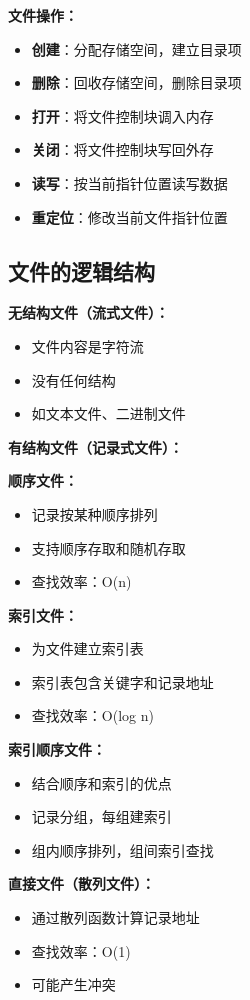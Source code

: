 \documentclass[lang=cn,newtx,10pt,scheme=chinese]{../../elegantbook}
\begin{document}
\textbf{文件操作：}
\begin{itemize}
  \item \textbf{创建}：分配存储空间，建立目录项
  \item \textbf{删除}：回收存储空间，删除目录项
  \item \textbf{打开}：将文件控制块调入内存
  \item \textbf{关闭}：将文件控制块写回外存
  \item \textbf{读写}：按当前指针位置读写数据
  \item \textbf{重定位}：修改当前文件指针位置
\end{itemize}

\subsection{文件的逻辑结构}

\textbf{无结构文件（流式文件）：}
\begin{itemize}
  \item 文件内容是字符流
  \item 没有任何结构
  \item 如文本文件、二进制文件
\end{itemize}

\textbf{有结构文件（记录式文件）：}

\textbf{顺序文件：}
\begin{itemize}
  \item 记录按某种顺序排列
  \item 支持顺序存取和随机存取
  \item 查找效率：O(n)
\end{itemize}

\textbf{索引文件：}
\begin{itemize}
  \item 为文件建立索引表
  \item 索引表包含关键字和记录地址
  \item 查找效率：O(log n)
\end{itemize}

\textbf{索引顺序文件：}
\begin{itemize}
  \item 结合顺序和索引的优点
  \item 记录分组，每组建索引
  \item 组内顺序排列，组间索引查找
\end{itemize}

\textbf{直接文件（散列文件）：}
\begin{itemize}
  \item 通过散列函数计算记录地址
  \item 查找效率：O(1)
  \item 可能产生冲突
\end{itemize}
\end{document}
